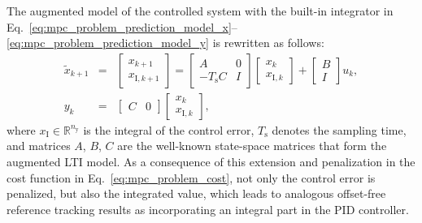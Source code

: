 \documentclass[preprint,12pt]{elsarticle}
\begin{document}
	The augmented model of the controlled system with the built-in integrator in Eq.~\eqref{eq:mpc_problem_prediction_model_x}--\eqref{eq:mpc_problem_prediction_model_y} is rewritten as follows:
	\begin{subequations}
		\begin{eqnarray} 
			\label{eq:mpc_augmented_model_x} 
			\widetilde{x}_{k+1} &=& \begin{bmatrix} x_{k+1} \\ x_{\mathrm{I},k+1}\end{bmatrix} = \begin{bmatrix} A & \textit{0} \\ -T_\mathrm{s} C & I \end{bmatrix} \begin{bmatrix} x_{k} \\ x_{\mathrm{I},k} \end{bmatrix} + \begin{bmatrix} B \\ I \end{bmatrix} u_{k}, \\
			\label{eq:mpc_augmented_model_y}
			y_k &=& \begin{bmatrix} C & \textit{0} \end{bmatrix} \begin{bmatrix} x_{k} \\ x_{\mathrm{I},k} \end{bmatrix},
		\end{eqnarray}
	\end{subequations}
	where $x_{\mathrm{I}} \in \mathbb{R}^{n_{\mathrm{y}}}$ is the integral of the control error, $T_\mathrm{s}$ denotes the sampling time, and matrices $A$, $B$, $C$ are the well-known state-space matrices that form the augmented LTI model. As a consequence of this extension and penalization in the cost function in Eq.~\eqref{eq:mpc_problem_cost}, not only the control error is penalized, but also the integrated value, which leads to analogous offset-free reference tracking results as incorporating an integral part in the PID controller.
	
\end{document}
